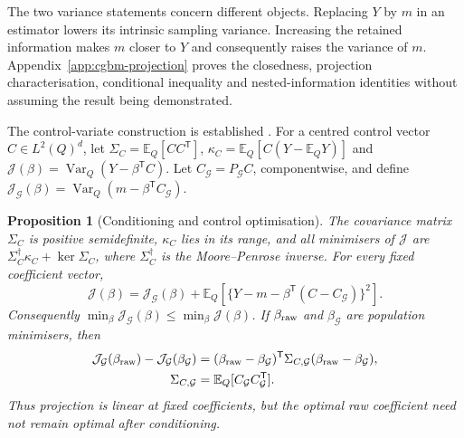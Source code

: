 \documentclass[11pt]{article}
\newtheorem{proposition}[theorem]{Proposition}
\begin{document}
The two variance statements concern different objects. Replacing $Y$ by
$m$ in an estimator lowers its intrinsic sampling variance. Increasing
the retained information makes $m$ closer to $Y$ and consequently raises
the variance of $m$. Appendix~\ref{app:cgbm-projection} proves the closedness,
projection characterisation, conditional inequality and nested-information
identities without assuming the result being demonstrated.

The control-variate construction is established \citep{nelson1990}.
For a centred control vector $C\in L^2(Q)^d$, let
$\Sigma_C=\mathbb E_Q[CC^{\mathsf T}]$,
$\kappa_C=\mathbb E_Q[C(Y-\mathbb E_QY)]$ and
$\mathcal J(\beta)=\operatorname{Var}_Q(Y-\beta^{\mathsf T}C)$.
Let $C_{\mathcal G}=P_{\mathcal G}C$, componentwise, and define
$\mathcal J_{\mathcal G}(\beta)=
\operatorname{Var}_Q(m-\beta^{\mathsf T}C_{\mathcal G})$.

\begin{proposition}[Conditioning and control optimisation]
\label{prop:cgbm-projected-controls}
The covariance matrix $\Sigma_C$ is positive semidefinite, $\kappa_C$ lies in its range,
and all minimisers of $\mathcal J$ are $\Sigma_C^\dagger \kappa_C+\ker \Sigma_C$, where $\Sigma_C^\dagger$
is the Moore--Penrose inverse. For every fixed coefficient vector,
\begin{equation}
 \mathcal J(\beta)=\mathcal J_{\mathcal G}(\beta)
 +\mathbb E_Q\!\left[
 \{Y-m-\beta^{\mathsf T}(C-C_{\mathcal G})\}^{2}\right].
 \label{eq:cgbm-joint-projection}
\end{equation}
Consequently $\min_\beta \mathcal J_{\mathcal G}(\beta)\leq\min_\beta \mathcal J(\beta)$.
If $\beta_{\rm raw}$ and $\beta_{\mathcal G}$ are population minimisers,
then
\begin{align}
 \mathcal J_{\mathcal G}(\beta_{\rm raw})-
 \mathcal J_{\mathcal G}(\beta_{\mathcal G})
 &=(\beta_{\rm raw}-\beta_{\mathcal G})^{\mathsf T}
 \Sigma_{C,\mathcal G}(\beta_{\rm raw}-\beta_{\mathcal G}),
 \label{eq:cgbm-coefficient-penalty}\\
 \Sigma_{C,\mathcal G}&=\mathbb E_Q[C_{\mathcal G}C_{\mathcal G}^{\mathsf T}].\notag
\end{align}
Thus projection is linear at fixed coefficients, but the optimal raw
coefficient need not remain optimal after conditioning.
\end{proposition}
\end{document}
